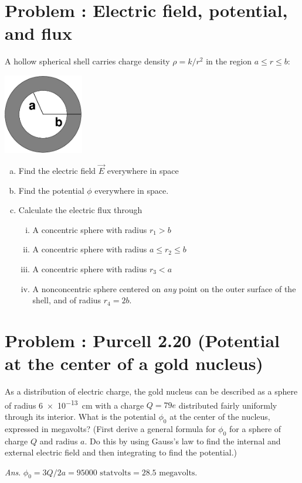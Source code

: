 \documentclass[problems]{esg8022pset}
\begin{document}
\section{Problem \thesection: Electric field, potential, and flux}
  A hollow spherical shell carries charge density $\rho = k/r^2$ in the
  region $a \le r \le b$:
  \begin{center}\includegraphics[width=3.5cm]{ps03_09}\end{center}
  \begin{enumerate}[(a)]
    \item Find the electric field $\vec E$ everywhere in space
    \item Find the potential $\phi$ everywhere in space.
    \item Calculate the electric flux through
      \begin{enumerate}[(i)]
        \item A concentric sphere with radius $r_1 > b$
        \item A concentric sphere with radius $a \le r_2 \le b$
        \item A concentric sphere with radius $r_3 < a$
        \item A nonconcentric sphere centered on \emph{any} point on the
          outer surface of the shell, and of radius $r_4 = 2b$.
      \end{enumerate}
  \end{enumerate}
\section{Problem \thesection: Purcell 2.20 (Potential at the center of a gold nucleus)}
  As a distribution of electric charge, the gold nucleus can be
  described as a sphere of radius \SI{6e-13}{\centi\meter} with a charge $Q = 79e$
  distributed fairly uniformly through its interior. What is the potential
  $\phi_0$ at the center of the nucleus, expressed in megavolts? (First derive
  a general formula for $\phi_0$ for a sphere of charge $Q$ and radius $a$. Do
  this by using Gauss's law to find the internal and external electric field
  and then integrating to find the potential.)
  \begin{flushright} \emph{Ans}. $\phi_0 = 3Q/2a = \num{95000}\text{ statvolts} = 28.5\text{ megavolts}$. \end{flushright}
\end{document}
